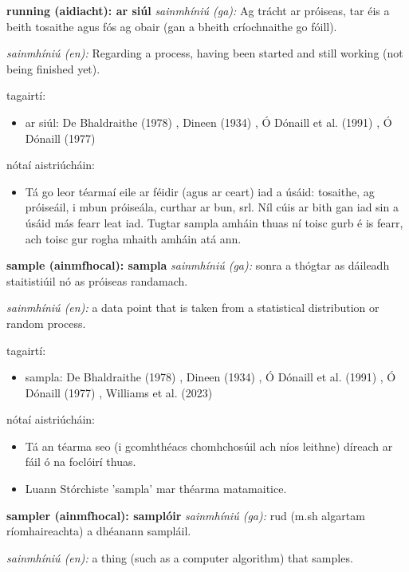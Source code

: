 \documentclass{article}
\begin{document}
\textbf{running (aidiacht): ar siúl}
\textit{sainmhíniú (ga):} Ag trácht ar próiseas, tar éis a beith tosaithe agus fós ag obair (gan a bheith críochnaithe go fóill).

\textit{sainmhíniú (en):} Regarding a process, having been started and still working (not being finished yet).

tagairtí:
\begin{itemize}
	\item ar siúl: De Bhaldraithe (1978) \cite{de-bhaldraithe}, Dineen (1934) \cite{dineen}, Ó Dónaill et al. (1991) \cite{focloir-beag}, Ó Dónaill (1977) \cite{odonaill}
\end{itemize}

nótaí aistriúcháin:
\begin{itemize}
	\item Tá go leor téarmaí eile ar féidir (agus ar ceart) iad a úsáid: tosaithe, ag próiseáil, i mbun próiseála, curthar ar bun, srl. Níl cúis ar bith gan iad sin a úsáid más fearr leat iad. Tugtar sampla amháin thuas ní toisc gurb é is fearr, ach toisc gur rogha mhaith amháin atá ann.
\end{itemize}


\textbf{sample (ainmfhocal): sampla}
\textit{sainmhíniú (ga):} sonra a thógtar as dáileadh staitistiúil nó as próiseas randamach.

\textit{sainmhíniú (en):} a data point that is taken from a statistical distribution or random process.

tagairtí:
\begin{itemize}
	\item sampla: De Bhaldraithe (1978) \cite{de-bhaldraithe}, Dineen (1934) \cite{dineen}, Ó Dónaill et al. (1991) \cite{focloir-beag}, Ó Dónaill (1977) \cite{odonaill}, Williams et al. (2023) \cite{storchiste}
\end{itemize}

nótaí aistriúcháin:
\begin{itemize}
	\item Tá an téarma seo (i gcomhthéacs chomhchosúil ach níos leithne) díreach ar fáil ó na foclóirí thuas.
	\item Luann Stórchiste 'sampla' mar théarma matamaitice.
\end{itemize}


\textbf{sampler (ainmfhocal): samplóir}
\textit{sainmhíniú (ga):} rud (m.sh algartam ríomhaireachta) a dhéanann sampláil.

\textit{sainmhíniú (en):} a thing (such as a computer algorithm) that samples.
\end{document}
